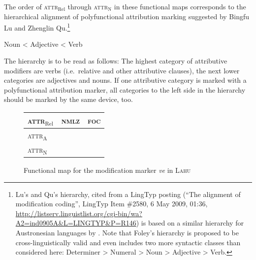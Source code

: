 The order of \textsc{attr}$_{\text{Rel}}$ through \textsc{attr}$_{\text{N}}$ in these functional maps corresponds to the hierarchical alignment of polyfunctional attribution marking suggested by Bingfu Lu and Zhenglin Qu.\footnote{Lu's and Qu's hierarchy, cited from a LingTyp posting (“The alignment of modification coding”, LingTyp Item \#2580, 6 May 2009, 01:36, \url{http://listserv.linguistlist.org/cgi-bin/wa?A2=ind0905A&L=LINGTYP&P=R146}) is based on a similar hierarchy for Austronesian languages by \textcite{foley1980}. Note that Foley's hierarchy is proposed to be cross-linguistically valid and even includes two more syntactic classes than considered here: Determiner > Numeral > Noun > Adjective > Verb.}
\begin{exe}
\ex	Noun < Adjective < Verb
\end{exe}
The hierarchy is to be read as follows: The highest category of attributive modifiers are verbs (i.e.~relative and other attributive clauses), the next lower categories are adjectives and nouns. If one attributive category is marked with a polyfunctional attribution marker, all categories to the left side in the hierarchy should be marked by the same device, too.

\begin{figure}
\parbox[b]{\textwidth}{
\begin{center}
\begin{tabular}{| l || c | c |}
\cline{1-1}
\\
\hline
\textsc{attr}$_{\text{Rel}}$ & \textsc{nmlz} & \textsc{foc}\\
\hline
\textsc{attr}$_{\text{A}}$\\
\cline{1-1}
\textsc{attr}$_{\text{N}}$\\
\cline{1-1}
\end{tabular}
\end{center}
}
\caption[Functional map for modification marking]{Functional map for the modification marker \textit{ve} in \textsc{Lahu}}
\label{lahu funcmap}
\end{figure}

